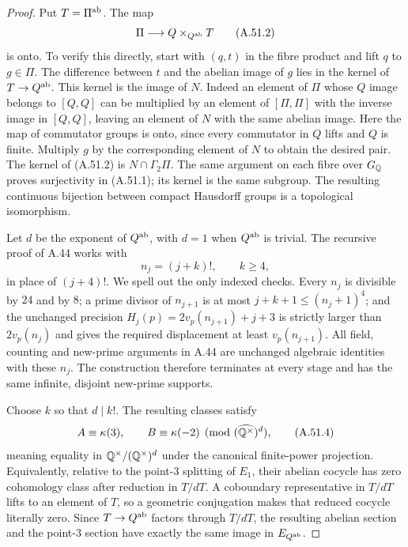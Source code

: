 \begin{proof}
Put $T=\Pi^{\rm ab}$.  The map
\[
               \Pi\longrightarrow Q\times_{Q^{\rm ab}}T
\tag{A.51.2}
\]
is onto.  To verify this directly, start with $(q,t)$ in the
fibre product and lift $q$ to $g\in\Pi$.  The difference
between $t$ and the abelian image of $g$ lies in the kernel
of $T\to Q^{\rm ab}$.  This kernel is the image of $N$.
Indeed an element of $\Pi$ whose $Q$ image belongs to
$[Q,Q]$ can be multiplied by an element of $[\Pi,\Pi]$
with the inverse image in $[Q,Q]$, leaving an element of $N$
with the same abelian image.  Here the map of commutator
groups is onto, since every commutator in $Q$ lifts and $Q$
is finite.  Multiply $g$ by the corresponding element of
$N$ to obtain the desired pair.  The kernel of (A.51.2) is
$N\cap\Gamma_2\Pi$.  The same argument on each fibre over
$G_\mathbb Q$ proves surjectivity in (A.51.1); its kernel is the
same subgroup.  The resulting continuous bijection between
compact Hausdorff groups is a topological isomorphism.

Let $d$ be the exponent of $Q^{\rm ab}$, with $d=1$ when
$Q^{\rm ab}$ is trivial.  The recursive proof of A.44 works
with
\[
                 n_j=(j+k)!,\qquad k\ge4,
\tag{A.51.3}
\]
in place of $(j+4)!$.  We spell out the only indexed checks.
Every $n_j$ is divisible by $24$ and by $8$; a prime divisor
of $n_{j+1}$ is at most $j+k+1\le(n_j+1)^4$; and the
unchanged precision
$H_j(p)=2v_p(n_{j+1})+j+3$ is strictly larger than
$2v_p(n_j)$ and gives the required displacement at least
$v_p(n_{j+1})$.  All field, counting and new-prime arguments
in A.44 are unchanged algebraic identities with these $n_j$.
The construction therefore terminates at every stage and
has the same infinite, disjoint new-prime supports.

Choose $k$ so that $d\mid k!$.  The resulting classes
satisfy
\[
           A\equiv\kappa(3),\qquad
           B\equiv\kappa(-2)
                 \pmod{(\widehat{\mathbb Q^\times})^d},
\tag{A.51.4}
\]
meaning equality in $\mathbb Q^\times/(\mathbb Q^\times)^d$ under the
canonical finite-power projection.  Equivalently, relative
to the point-$3$ splitting of $E_1$, their abelian cocycle
has zero cohomology class after reduction in $T/dT$.
A coboundary representative in $T/dT$ lifts to an element
of $T$, so a geometric conjugation makes that reduced
cocycle literally zero.  Since $T\to Q^{\rm ab}$ factors
through $T/dT$, the resulting abelian section and the
point-$3$ section have exactly the same image in
$E_{Q^{\rm ab}}$.


\end{proof}
